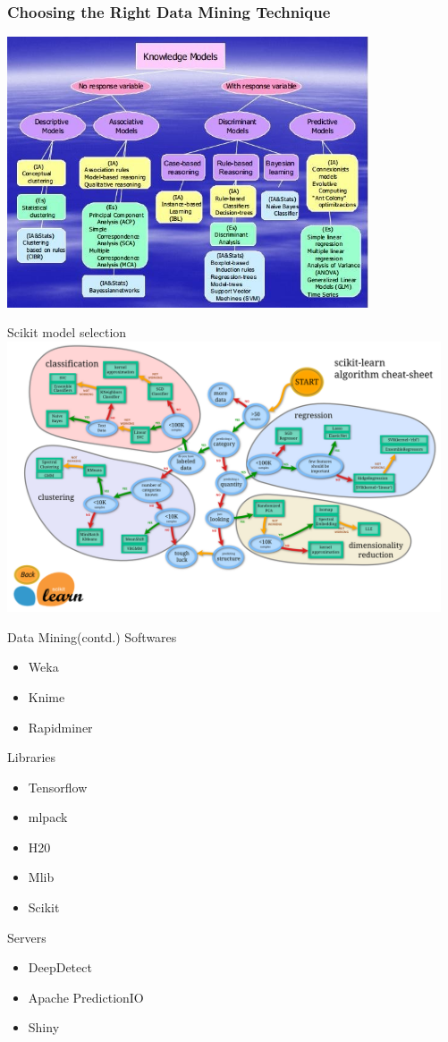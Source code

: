 \documentclass{beamer}
\begin{document}
\begingroup
\small
\begin{frame}
	\frametitle{Choosing the Right Data Mining Technique}
	\includegraphics[width=\columnwidth,height=8cm]{ppt_figures/selectionofdatamining.jpeg}
\end{frame}

\begin{frame}{Scikit model selection}
	\includegraphics[width=\columnwidth,height=8cm]{ppt_figures/scikitlearn.png}
\end{frame}
\endgroup


\begin{frame}{Data Mining(contd.)}
	Softwares
		\begin{itemize}
			\item Weka
			\item Knime
			\item Rapidminer
		\end{itemize}
	Libraries
		\begin{itemize}
			\item Tensorflow
			\item mlpack
			\item H20
			\item Mlib
			\item Scikit
		\end{itemize}
	Servers 
		\begin{itemize}
			\item DeepDetect
			\item Apache PredictionIO
			\item Shiny
		\end{itemize}
\end{frame}
\end{document}
